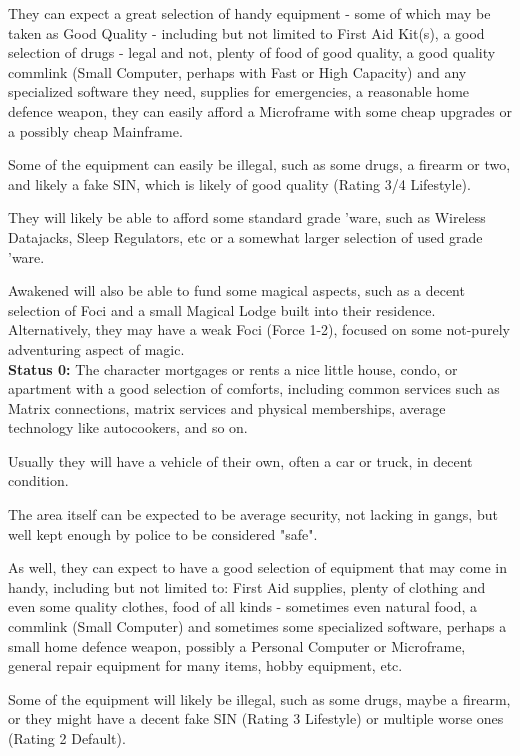 \begin{multicols}{2}
\begin{coloredbox}
	They can expect a great selection of handy equipment - some of which may be taken as Good Quality - including but not limited to First Aid Kit(s), a good selection of drugs - legal and not, plenty of food of good quality, a good quality commlink (Small Computer, perhaps with Fast or High Capacity) and any specialized software they need, supplies for emergencies, a reasonable home defence weapon, they can easily afford a Microframe with some cheap upgrades or a possibly cheap Mainframe. 
	
	Some of the equipment can easily be illegal, such as some drugs, a firearm or two, and likely a fake SIN, which is likely of good quality (Rating 3/4 Lifestyle).
	
	They will likely be able to afford some standard grade 'ware, such as Wireless Datajacks, Sleep Regulators, etc or a somewhat larger selection of used grade 'ware.
	
	Awakened will also be able to fund some magical aspects, such as a decent selection of Foci and a small Magical Lodge built into their residence. Alternatively, they may have a weak Foci (Force 1-2), focused on some not-purely adventuring aspect of magic. \\
	
	\textbf{Status 0:} The character mortgages or rents a nice little house, condo, or apartment with a good selection of comforts, including common services such as Matrix connections, matrix services and physical memberships, average technology like autocookers, and so on. 
	
	Usually they will have a vehicle of their own, often a car or truck, in decent condition. 
	
	The area itself can be expected to be average security, not lacking in gangs, but well kept enough by police to be considered "safe". 
	
	As well, they can expect to have a good selection of equipment that may come in handy, including but not limited to: First Aid supplies, plenty of clothing and even some quality clothes, food of all kinds - sometimes even natural food, a commlink (Small Computer) and sometimes some specialized software, perhaps a small home defence weapon, possibly a Personal Computer or Microframe, general repair equipment for many items, hobby equipment, etc. 
	
	Some of the equipment will likely be illegal, such as some drugs, maybe a firearm, or they might have a decent fake SIN (Rating 3 Lifestyle) or multiple worse ones (Rating 2 Default).
	

\end{coloredbox}
\end{multicols}
